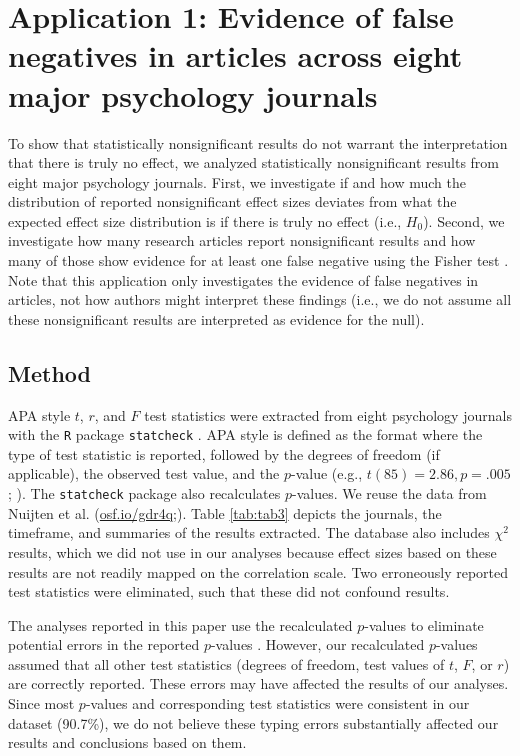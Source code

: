 \documentclass{article}
\begin{document}
\section*{Application 1: Evidence of false negatives in articles across eight major psychology journals}

To show that statistically nonsignificant results do not warrant the interpretation that there is truly no effect, we analyzed statistically nonsignificant results from eight major psychology journals. First, we investigate if and how much the distribution of reported nonsignificant effect sizes deviates from what the expected effect size distribution is if there is truly no effect (i.e., $H_0$). Second, we investigate how many research articles report nonsignificant results and how many of those show evidence for at least one false negative using the Fisher test \cite{Fisher1925-jl}. Note that this application only investigates the evidence of false negatives in articles, not how authors might interpret these findings (i.e., we do not assume all these nonsignificant results are interpreted as evidence for the null).

\subsection*{Method}




APA style $t$, $r$, and $F$ test statistics were extracted from eight psychology journals with the \texttt{R} package \texttt{statcheck} \cite{Nuijten2015-od,Epskamp2015-ps}. APA style is defined as the format where the type of test statistic is reported, followed by the degrees of freedom (if applicable), the observed test value, and the $p$-value (e.g., $t(85)=2.86, p=.005$; \cite{American_Psychological_Association2010-qe}). The \texttt{statcheck} package also recalculates $p$-values. We reuse the data from Nuijten et al. (\url{osf.io/gdr4q};\cite{Nuijten2015-od}). Table \ref{tab:tab3} depicts the journals, the timeframe, and summaries of the results extracted. The database also includes $\chi^2$ results, which we did not use in our analyses because effect sizes based on these results are not readily mapped on the correlation scale. Two erroneously reported test statistics were eliminated, such that these did not confound results. 

The analyses reported in this paper use the recalculated $p$-values to eliminate potential errors in the reported $p$-values \cite{Bakker2011-hg,Nuijten2015-od}. However, our recalculated $p$-values assumed that all other test statistics (degrees of freedom, test values of $t$, $F$, or $r$) are correctly reported. These errors may have affected the results of our analyses. Since most $p$-values and corresponding test statistics were consistent in our dataset (90.7\%), we do not believe these typing errors substantially affected our results and conclusions based on them.
\end{document}
